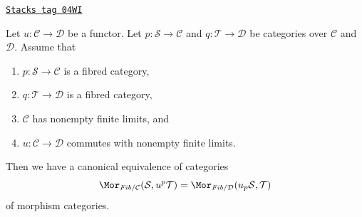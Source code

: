 \begin{lemma}
\label{stacks-lemma-adjointness-pullback-pushforward}
\href{https://stacks.math.columbia.edu/tag/04WI}{\texttt{Stacks tag 04WI}}

Let $u : \mathcal{C} \to \mathcal{D}$ be a functor.
Let $p : \mathcal{S} \to \mathcal{C}$ and $q : \mathcal{T} \to \mathcal{D}$
be categories over $\mathcal{C}$ and $\mathcal{D}$. Assume that
\begin{enumerate}
\item $p : \mathcal{S} \to \mathcal{C}$ is a fibred category,
\item $q : \mathcal{T} \to \mathcal{D}$ is a fibred category,
\item $\mathcal{C}$ has nonempty finite limits, and
\item $u : \mathcal{C} \to \mathcal{D}$ commutes with nonempty finite limits.
\end{enumerate}
Then we have a canonical equivalence of categories
$$
\Mor_{\textit{Fib}/\mathcal{C}}(\mathcal{S}, u^p\mathcal{T})
=
\Mor_{\textit{Fib}/\mathcal{D}}(u_p\mathcal{S}, \mathcal{T})
$$
of morphism categories.
\end{lemma}

